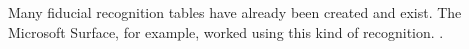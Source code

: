 Many fiducial recognition tables have already been created and exist. The Microsoft Surface, for example, worked using this kind of recognition. \cite{Rubin2012}.
